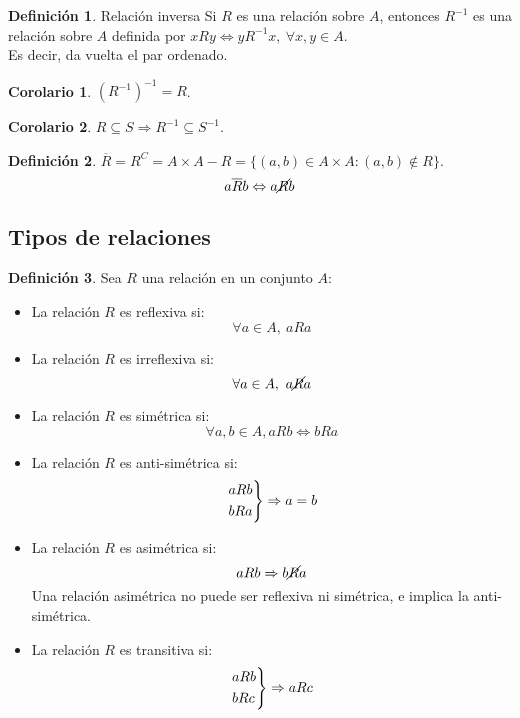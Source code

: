 \documentclass[10pt]{article}
\theoremstyle{definition}
\newtheorem{definition}{Definición}[section]
\newtheorem{corollary}{Corolario}[theorem]
\begin{document}
    \begin{definition}{Relación inversa}
        Si $R$ es una relación sobre $A$, entonces $R^{-1}$ es una relación sobre $A$ definida por $xRy\Leftrightarrow yR^{-1}x,\ \forall x,y\in A$.
        \\Es decir, da vuelta el par ordenado.
    \end{definition}
    \begin{corollary}
        $(R^{-1})^{-1}=R$.
    \end{corollary}
    \begin{corollary}
        $R\subseteq S\Rightarrow R^{-1}\subseteq S^{-1}$.
    \end{corollary}
    \begin{definition}
        $\overline{R}=R^C=A\times A-R=\{(a,b)\in A\times A: (a,b)\notin R\}$.\\
        $$a\overline{R}b\Leftrightarrow a\cancel{R}b$$
    \end{definition}
   \newpage\subsection{Tipos de relaciones}
    \begin{definition}
        Sea $R$ una relación en un conjunto $A$:
        \begin{itemize}
            \item La relación $R$ es reflexiva si: $$\forall a\in A,\ aRa$$
            \item La relación $R$ es irreflexiva si: $$\forall a\in A,\ a\cancel{R}a$$
            \item La relación $R$ es simétrica si: $$\forall a,b\in A, aRb\Leftrightarrow bRa$$
            \item La relación $R$ es anti-simétrica si: $$\begin{rcases}aRb\\bRa\end{rcases}\Rightarrow a=b$$
            \item La relación $R$ es asimétrica si: $$aRb\Rightarrow b\cancel{R}a$$
                Una relación asimétrica no puede ser reflexiva ni simétrica, e implica la anti-simétrica.
            \item La relación $R$ es transitiva si: $$\begin{rcases}aRb\\bRc\end{rcases}\Rightarrow aRc$$
        \end{itemize}
    \end{definition}
\end{document}
